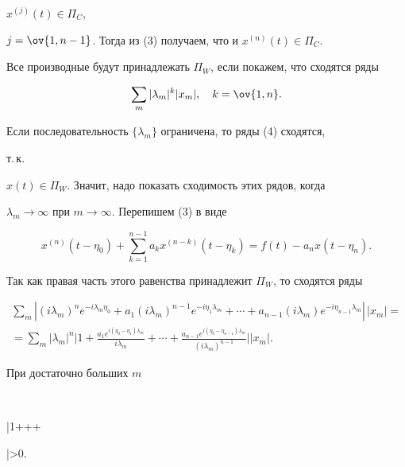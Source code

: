 $x^{(j)}(t)\in\Pi_C$, 


$j=\ov{1,n-1}$. Тогда из (3) получаем, что и $x^{(n)}(t)\in\Pi_C$. 


Все производные будут принадлежать $\Pi_W$, если покажем, что сходятся ряды 


\begin{equation} 


\sum_m|\lambda_m|^k|x_m|,\quad k=\ov{1,n}. 


\end{equation} 


Если последовательность $\{\lambda_m\}$ ограничена, то ряды (4) сходятся, 


т.\,к. 


$x(t)\in\Pi_W$. Значит, надо показать сходимость этих рядов, когда 


$\lambda_m\to\infty$ при $m\to\infty$. Перепишем (3) в виде 


$$ 


x^{(n)}(t-\eta_0)+\sum^{n-1}_{k=1}a_k x^{(n-k)} 


(t-\eta_k)=f(t)-a_n x(t-\eta_n). 


$$ 


Так как правая часть этого равенства принадлежит $\Pi_W$, то сходятся ряды 


\begin{multline*} 


\sum_m|(i\lambda_m)^n e^{-i\lambda_m\eta_0}+a_1(i\lambda_m)^{n-1} 


e^{-i\eta_1\lambda_m}+\dotsb+a_{n-1}(i\lambda_m) 


e^{-i\eta_{n-1}\lambda_m}|\,|x_m|= \\ 


% 


=\sum_m|\lambda_m|^n\bigg|1+ 


\frac{a_1e^{i(\eta_0-\eta_1)\lambda_m}}{i\lambda_m}+\dotsb+ 


\frac{a_{n-1}e^{i(\eta_0-\eta_{n-1})\lambda_m}}{(i\lambda_m)^{n-1}} 


\bigg| |x_m|. 


\end{multline*} 


При достаточно больших $m$ 


$$ 


\bigg|1++\dotsb+ 




\bigg|\ge\alpha>0. 


